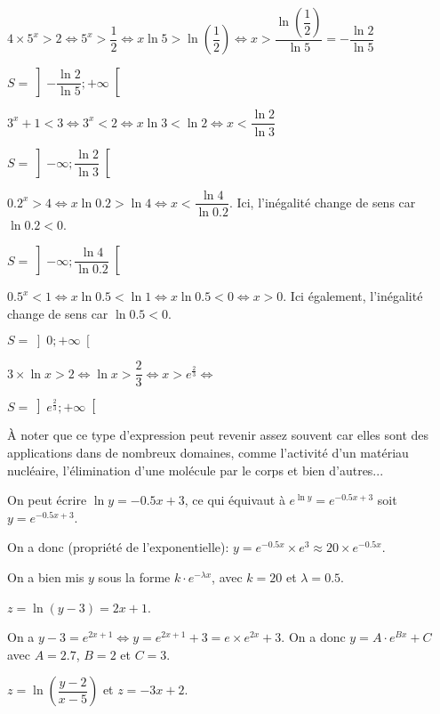 \documentclass[a4paper,12pt]{scrartcl}
\begin{document}
\question{}
$4 \times 5^x > 2 \Leftrightarrow 5^x > \dfrac{1}{2} \Leftrightarrow x \ln 5 > \ln \left( \dfrac{1}{2} \right) \Leftrightarrow x > \dfrac{\ln \left( \dfrac{1}{2} \right)}{\ln 5} = -\dfrac{\ln 2}{\ln 5}$

$S = \left] -\dfrac{\ln 2}{\ln 5} ; +\infty \right[$

\question{}
$3^x + 1 < 3 \Leftrightarrow 3^x < 2 \Leftrightarrow x \ln 3 < \ln 2 \Leftrightarrow x < \dfrac{\ln 2}{\ln 3}$

$S = \left] -\infty ; \dfrac{\ln 2}{\ln 3} \right[$

\question{}
$0.2^x > 4 \Leftrightarrow x \ln 0.2 > \ln 4 \Leftrightarrow x < \dfrac{\ln 4}{\ln 0.2}$. Ici, l'inégalité change de sens car $\ln 0.2 < 0$.

$S = \left] - \infty ; \dfrac{\ln 4}{\ln 0.2} \right[$

\question{}
$ 0.5^x < 1 \Leftrightarrow x \ln 0.5 < \ln 1 \Leftrightarrow x \ln 0.5 < 0 \Leftrightarrow x > 0$. Ici également, l'inégalité change de sens car $\ln 0.5 < 0$.

$S = \left] 0 ; +\infty \right[$

\question{}
$3 \times \ln x > 2 \Leftrightarrow \ln x > \dfrac{2}{3} \Leftrightarrow x > e^{\frac{2}{3}} \Leftrightarrow $

$S = \left] e^{\frac{2}{3}} ; +\infty \right[$

À noter que ce type d'expression peut revenir assez souvent car elles sont des applications dans de nombreux domaines, comme l'activité d'un matériau nucléaire, l'élimination d'une molécule par le corps et bien d'autres...

On peut écrire $\ln y = -0.5x + 3$, ce qui équivaut à $e^{\ln y} = e^{-0.5x + 3}$ soit $y = e^{-0.5x + 3}$.

On a donc (propriété de l'exponentielle): $y = e^{-0.5x} \times e^{3} \approx 20 \times e^{-0.5x}$.

On a bien mis $y$ sous la forme $k \cdot e^{- \lambda x}$, avec $k = 20$ et $\lambda = 0.5$.

\exo{}

$z = \ln(y-3) = 2x+1$. 

On a $y - 3 = e^{2x+1} \Leftrightarrow y = e^{2x+1} +3 = e \times e^{2x} + 3$. On a donc $y = A \cdot e^{Bx} + C$ avec $A = 2.7$, $B = 2$ et $C = 3$.

\exo{}

$z = \ln \left( \dfrac{y-2}{x-5} \right)$ et $z = -3x + 2$. 
\end{document}
